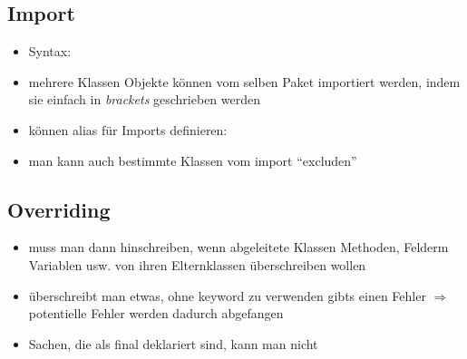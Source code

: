 \subsection{Import}
\begin{itemize}
  \item Syntax:
  
  
  
  \item mehrere Klassen \oder Objekte können vom selben Paket importiert
  werden, indem sie einfach in \textit{brackets} geschrieben werden
  
  
  
  \item können alias für Imports definieren:
  
  
  
  \item man kann auch bestimmte Klassen vom import \enquote{excluden}
  
  
  
\end{itemize}


\subsection{Overriding}
\begin{itemize}
  \item muss man dann hinschreiben, wenn abgeleitete Klassen Methoden, Felderm
  Variablen usw. von ihren Elternklassen überschreiben wollen
  \item überschreibt man etwas, ohne keyword  zu verwenden
  gibts einen Fehler $\Rightarrow$ potentielle Fehler werden dadurch
  abgefangen
  \item Sachen, die als final deklariert sind, kann man nicht 
\end{itemize}


